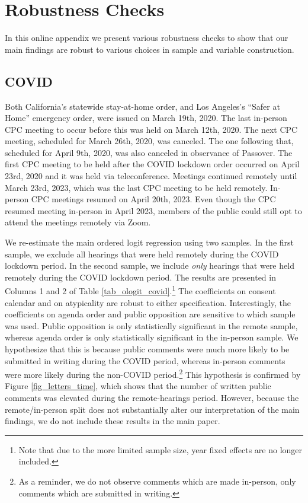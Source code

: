 \section{Robustness Checks}

In this online appendix we present various robustness checks to show that our main findings are robust to various choices in sample and variable construction.

\subsection{COVID}

Both California's statewide stay-at-home order, and Los Angeles's ``Safer at Home'' emergency order, were issued on March 19th, 2020. The last in-person CPC meeting to occur before this was held on March 12th, 2020. The next CPC meeting, scheduled for March 26th, 2020, was canceled. The one following that, scheduled for April 9th, 2020, was also canceled in observance of Passover. The first CPC meeting to be held after the COVID lockdown order occurred on April 23rd, 2020 and it was held via teleconference. Meetings continued remotely until March 23rd, 2023, which was the last CPC meeting to be held remotely. In-person CPC meetings resumed on April 20th, 2023. Even though the CPC resumed meeting in-person in April 2023, members of the public could still opt to attend the meetings remotely via Zoom.

We re-estimate the main ordered logit regression using two samples. In the first sample, we exclude all hearings that were held remotely during the COVID lockdown period. In the second sample, we include \emph{only} hearings that were held remotely during the COVID lockdown period. The results are presented in Columns 1 and 2 of Table \ref{tab_ologit_covid}.\footnote{Note that due to the more limited sample size, year fixed effects are no longer included.} The coefficients on consent calendar and on atypicality are robust to either specification. Interestingly, the coefficients on agenda order and public opposition are sensitive to which sample was used. Public opposition is only statistically significant in the remote sample, whereas agenda order is only statistically significant in the in-person sample. We hypothesize that this is because public comments were much more likely to be submitted in writing during the COVID period, whereas in-person comments were more likely during the non-COVID period.\footnote{As a reminder, we do not observe comments which are made in-person, only comments which are submitted in writing.} This hypothesis is confirmed by Figure \ref{fig_letters_time}, which shows that the number of written public comments was elevated during the remote-hearings period. However, because the remote/in-person split does not substantially alter our interpretation of the main findings, we do not include these results in the main paper.

